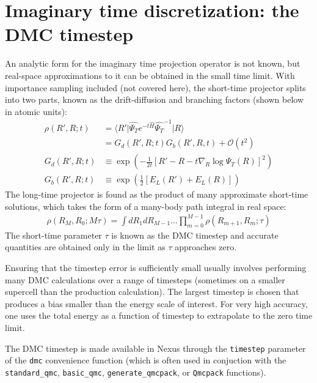 \documentclass[oneside,11pt]{memoir}
\numberwithin{equation}{section}
\newcommand{\ket}[1]{\lvert #1 \rangle}
\newcommand{\bra}[1]{\langle #1 \rvert}
\newcommand{\expvalnh}[3]{\bra{#1}#2\ket{#3}}
\begin{document}
\section{Imaginary time discretization: the DMC timestep}
An analytic form for the imaginary time projection operator is not known, but 
real-space approximations to it can be obtained in the small time limit.  
With importance sampling included (not covered here), the short-time projector 
splits into two parts, known as the drift-diffusion and branching factors 
(shown below in atomic units):
\begin{align}
   \rho(R',R;t)  &= \expvalnh{R'}{\hat{\Psi_T}e^{-t\hat{H}}\hat{\Psi_T}^{-1}}{R}\\ 
    &= G_d(R',R;t)G_b(R',R,t) +\mathcal{O}(t^2) \\
  G_d(R',R;t) &\equiv \exp{\left(-\tfrac{1}{2t}\left[R'-R-t\nabla_R\log\Psi_T(R)\right]^2\right)} \\
  G_b(R',R;t) &\equiv \exp{\left(\tfrac{1}{2}\left[E_L(R')+E_L(R)\right]\right)}
\end{align}
The long-time projector is found as the product of many approximate short-time 
solutions, which takes the form of a many-body path integral in real space:
\begin{align}
  \rho(R_M,R_0; M\tau) = \int dR_1dR_{M-1}\ldots \prod_{m=0}^{M-1}\rho(R_{m+1},R_m;\tau)
\end{align}
The short-time parameter $\tau$ is known as the DMC timestep and accurate 
quantities are obtained only in the limit as $\tau$ approaches zero.

Ensuring that the timestep error is sufficiently small usually involves 
performing many DMC calculations over a range of timesteps (sometimes on 
a smaller supercell than the production calculation).  The largest timestep 
is chosen that produces a bias smaller than the energy scale of interest.  
For very high accuracy, one uses the total energy as a function of timestep to 
extrapolate to the zero time limit.

The DMC timestep is made available in Nexus through the 
\texttt{timestep} parameter of the \texttt{dmc} convenience function 
(which is often used in conjuction with the \texttt{standard\_qmc},  
\texttt{basic\_qmc}, \texttt{generate\_qmcpack}, or \texttt{Qmcpack} 
functions). 
\end{document}
